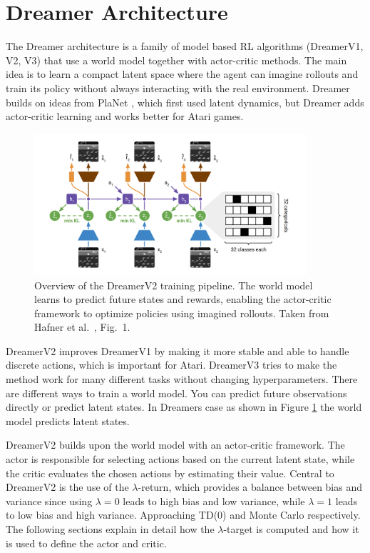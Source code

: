 \documentclass[
	english,
	ruledheaders=section,
	class=report,
	thesis={type=master},
	accentcolor=9c,
	custommargins=true,
	marginpar=false,
	parskip=half-,
	fontsize=11pt,
]{tudapub}
\begin{document}
\section{Dreamer Architecture}
\label{sec:dreamer_architecture}

The Dreamer architecture is a family of model based RL algorithms (DreamerV1,
V2, V3) that use a world model together with actor-critic methods. The main
idea is to learn a compact latent space where the agent can imagine rollouts
and train its policy without always interacting with the real environment.
Dreamer builds on ideas from PlaNet \cite{hafner2019learninglatentdynamicsplanning}, which first used latent dynamics, but
Dreamer adds actor-critic learning and works better for Atari games.

\begin{figure}[ht]
	\centering
	\includegraphics[width=0.9\textwidth]{images/DreamerFlow.png}
	\caption{Overview of the DreamerV2 training pipeline. The world model learns to predict future states and rewards, enabling the actor-critic framework to optimize policies using imagined rollouts. Taken from Hafner et al.~\cite{hafner2021mastering}, Fig.~1.}
	\label{fig:dreamer_flow}
\end{figure}

DreamerV2 improves DreamerV1 by making it more stable and able to handle
discrete actions, which is important for Atari. DreamerV3 tries to make the
method work for many different tasks without changing hyperparameters. There
are different ways to train a world model. You can predict future observations
directly or predict latent states. In Dreamers case as shown in Figure
\ref{fig:dreamer_flow} the world model predicts latent states.

DreamerV2 builds upon the world model with an actor-critic framework. The actor
is responsible for selecting actions based on the current latent state, while
the critic evaluates the chosen actions by estimating their value. Central to DreamerV2 is the
use of the $\lambda$-return, which provides a balance between bias and variance
since using $\lambda=0$ leads to high bias and low variance, while $\lambda=1$ leads to low bias and high variance. Approaching
TD(0) and Monte Carlo respectively. The following sections explain in detail how the
$\lambda$-target is computed and how it is used to define the actor and critic.
\end{document}
